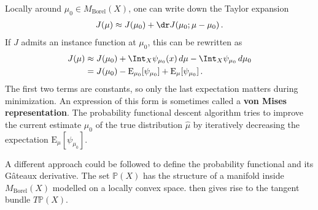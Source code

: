     Locally around $\mu_0\in M_{\text{Borel}}(X)$, one can write down the Taylor expansion
    \begin{gather*}
        J(\mu)\approx J(\mu_0) + \dr J(\mu_0;\mu-\mu_0)\,.
    \end{gather*}
    If $J$ admits an instance function at $\mu_0$, this can be rewritten as
    \begin{gather}
        \begin{aligned}
            J(\mu)&\approx J(\mu_0) + \Int_X\psi_{\mu_0}(x)\,d\mu - \Int_X\psi_{\mu_0}\,d\mu_0\\
            &= J(\mu_0) - \mathrm{E}_{\mu_0}[\psi_{\mu_0}] + \mathrm{E}_\mu[\psi_{\mu_0}]\,.
        \end{aligned}
    \end{gather}
    The first two terms are constants, so only the last expectation matters during minimization. An expression of this form is sometimes called a \textbf{von Mises representation}. The probability functional descent algorithm tries to improve the current estimate $\mu_0$ of the true distribution $\widehat{\mu}$ by iteratively decreasing the expectation $\mathrm{E}_\mu[\psi_{\mu_0}]$.

    A different approach could be followed to define the probability functional and its G\^ateaux derivative. The set $\mathbb{P}(X)$ has the structure of a manifold inside $M_{\text{Borel}}(X)$ modelled on a locally convex space.  then gives rise to the tangent bundle $T\mathbb{P}(X)$.

